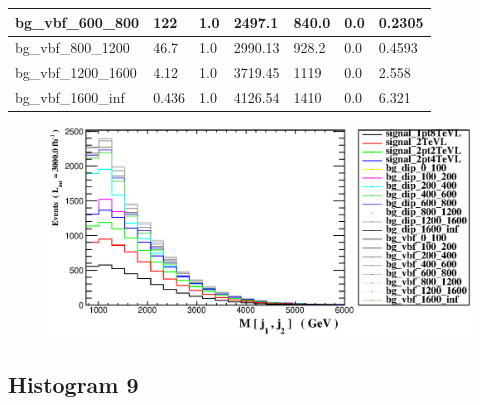 \documentclass[a4paper, 10pt]{article}
\begin{document}
\begin{table}[H]
\begin{center}
\begin{tabular}{|m{23.0mm}|m{23.0mm}|m{18.0mm}|m{19.0mm}|m{19.0mm}|m{19.0mm}|m{19.0mm}|}
      \hline
      {\cellcolor{white}         bg\_vbf\_600\_800}& {\cellcolor{white}         122}& {\cellcolor{white}         1.0}& {\cellcolor{white}         2497.1}& {\cellcolor{white}         840.0}& {\cellcolor{green}         0.0}& {\cellcolor{green}         0.2305}\\
      \hline
      {\cellcolor{white}         bg\_vbf\_800\_1200}& {\cellcolor{white}         46.7}& {\cellcolor{white}         1.0}& {\cellcolor{white}         2990.13}& {\cellcolor{white}         928.2}& {\cellcolor{green}         0.0}& {\cellcolor{green}         0.4593}\\
      \hline
      {\cellcolor{white}         bg\_vbf\_1200\_1600}& {\cellcolor{white}         4.12}& {\cellcolor{white}         1.0}& {\cellcolor{white}         3719.45}& {\cellcolor{white}         1119}& {\cellcolor{green}         0.0}& {\cellcolor{green}         2.558}\\
      \hline
      {\cellcolor{white}         bg\_vbf\_1600\_inf}& {\cellcolor{white}         0.436}& {\cellcolor{white}         1.0}& {\cellcolor{white}         4126.54}& {\cellcolor{white}         1410}& {\cellcolor{orange}         0.0}& {\cellcolor{orange}         6.321}\\
\hline
    \end{tabular}
  \end{center}
\end{table}

\begin{figure}[H]
  \begin{center}
    \includegraphics[scale=0.45]{selection_7.eps}\\
\caption{   }
  \end{center}
\end{figure}
      \newpage
\subsection{ Histogram 9}
\end{document}
